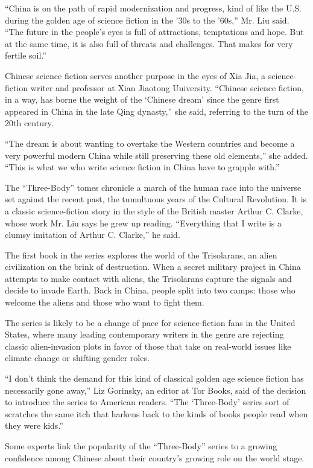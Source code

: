 ``China is on the path of rapid modernization and progress, kind of like
the U.S. during the golden age of science fiction in the '30s to the
'60s,'' Mr. Liu said. ``The future in the people's eyes is full of
attractions, temptations and hope. But at the same time, it is also full
of threats and challenges. That makes for very fertile soil.''

Chinese science fiction serves another purpose in the eyes of Xia Jia, a
science-fiction writer and professor at Xian Jiaotong University.
``Chinese science fiction, in a way, has borne the weight of the
`Chinese dream' since the genre first appeared in China in the late Qing
dynasty,'' she said, referring to the turn of the 20th century.

``The dream is about wanting to overtake the Western countries and
become a very powerful modern China while still preserving these old
elements,'' she added. ``This is what we who write science fiction in
China have to grapple with.''

The ``Three-Body'' tomes chronicle a march of the human race into the
universe set against the recent past, the tumultuous years of the
Cultural Revolution. It is a classic science-fiction story in the style
of the British master Arthur C. Clarke, whose work Mr. Liu says he grew
up reading. ``Everything that I write is a clumsy imitation of Arthur C.
Clarke,'' he said.

The first book in the series explores the world of the Trisolarans, an
alien civilization on the brink of destruction. When a secret military
project in China attempts to make contact with aliens, the Trisolarans
capture the signals and decide to invade Earth. Back in China, people
split into two camps: those who welcome the aliens and those who want to
fight them.

The series is likely to be a change of pace for science-fiction fans in
the United States, where many leading contemporary writers in the genre
are rejecting classic alien-invasion plots in favor of those that take
on real-world issues like climate change or shifting gender roles.

``I don't think the demand for this kind of classical golden age science
fiction has necessarily gone away,'' Liz Gorinsky, an editor at Tor
Books, said of the decision to introduce the series to American readers.
``The `Three-Body' series sort of scratches the same itch that harkens
back to the kinds of books people read when they were kids.''

Some experts link the popularity of the ``Three-Body'' series to a
growing confidence among Chinese about their country's growing role on
the world stage.

